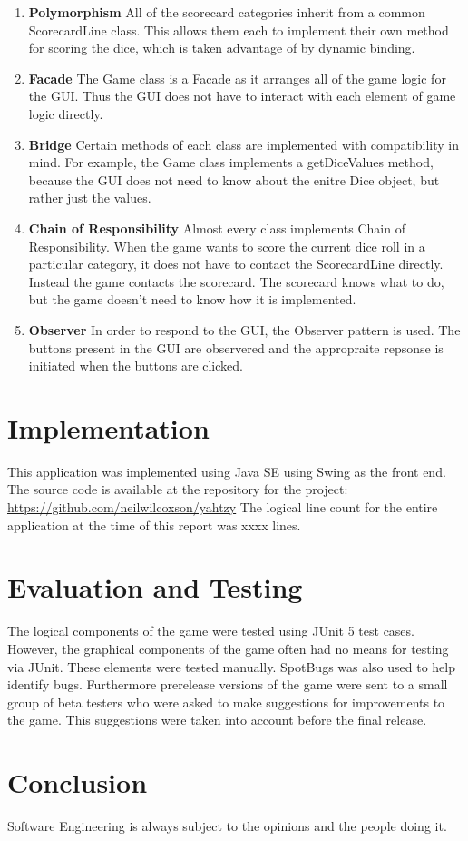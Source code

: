 \documentclass[12pt]{article}
\begin{document}
\begin{enumerate}
\item \textbf{Polymorphism} \newline
All of the scorecard categories inherit from a common ScorecardLine class.  This allows them each to implement their own method for scoring the dice, which is taken advantage of by dynamic binding.
\item \textbf{Facade}\newline
The Game class is a Facade as it arranges all of the game logic for the GUI.  Thus the GUI does not have to interact with each element of game logic directly.
\item \textbf{Bridge}\newline
Certain methods of each class are implemented with compatibility in mind.  For example, the Game class implements a getDiceValues method, because the GUI does not need to know about the enitre Dice object, but rather just the values.

\item \textbf{Chain of Responsibility}\newline
Almost every class implements Chain of Responsibility.  When the game wants to score the current dice roll in a particular category, it does not have to contact the ScorecardLine directly.  Instead the game contacts the scorecard.  The scorecard knows what to do, but the game doesn't need to know how it is implemented.
\item \textbf{Observer}\newline
In order to respond to the GUI, the Observer pattern is used.  The buttons present in the GUI are observered and the appropraite repsonse is initiated when the buttons are clicked.
\end{enumerate}

\section*{Implementation}
This application was implemented using Java SE using Swing as the front end.  The source code is available at the repository for the project:
\url{https://github.com/neilwilcoxson/yahtzy}\newline\newline
\noindent The logical line count for the entire application at the time of this report was xxxx lines.

\section*{Evaluation and Testing}
The logical components of the game were tested using JUnit 5 test cases.  However, the graphical components of the game often had no means for testing via JUnit.  These elements were tested manually.  SpotBugs was also used to help identify bugs.  Furthermore prerelease versions of the game were sent to a small group of beta testers who were asked to make suggestions for improvements to the game.  This suggestions were taken into account before the final release.

\section*{Conclusion}
Software Engineering is always subject to the opinions and the people doing it.
\end{document}
